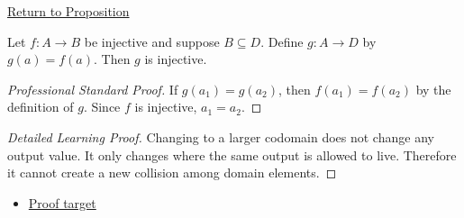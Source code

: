 \newpage
{}
\label{prf:enlarge-codomain-preserves-injective}

\begin{remark*}[Return]
\hyperref[prop:enlarge-codomain-preserves-injective]{Return to Proposition}
\end{remark*}

\begin{proposition*}
Let $f:A\to B$ be injective and suppose $B\subseteq D$. Define
$g:A\to D$ by $g(a)=f(a)$. Then $g$ is injective.
\end{proposition*}

\begin{proof}[Professional Standard Proof]
\LRAProofBodyStart
If $g(a_1)=g(a_2)$, then $f(a_1)=f(a_2)$ by the definition of $g$. Since
$f$ is injective, $a_1=a_2$.
\end{proof}

\begin{proof}[Detailed Learning Proof]
\LRAProofBodyStart
Changing to a larger codomain does not change any output value. It only changes
where the same output is allowed to live. Therefore it cannot create a new
collision among domain elements.
\end{proof}
\begin{remark*}
\end{remark*}



\begin{dependencies}
\begin{itemize}
  \item \hyperref[prop:enlarge-codomain-preserves-injective]{Proof target}
\end{itemize}
\end{dependencies}

\clearpage

